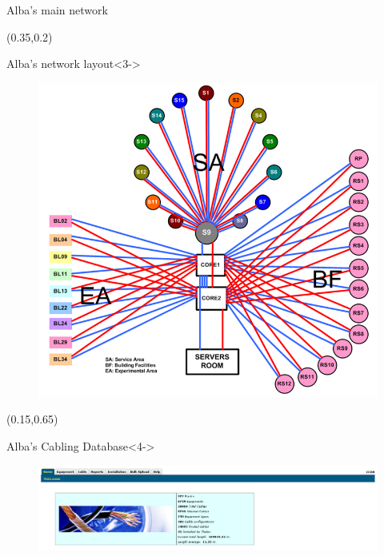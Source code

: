 \documentclass{beamer}
\begin{document}
\begin{frame}
\begin{textblock*}{50mm}
\begin{block}{Alba's main network}
\begin{figure}
            \end{figure}
        \end{block}
    \end{textblock*}
    \begin{textblock*}{50mm}(0.35\textwidth,0.2\textheight)
        \begin{block}{Alba's network layout}<3->
            \begin{figure}
                \includegraphics[width=\textwidth]{imgs/alba/Alba_NetworkLayout.png}
            \end{figure}
        \end{block}
    \end{textblock*}
    \begin{textblock*}{100mm}(0.15\textwidth,0.65\textheight)
        \begin{block}{Alba's Cabling Database}<4->
            \begin{figure}
                \includegraphics[width=\textwidth]{imgs/alba/20130916_ccdb.png}
            \end{figure}

\end{block}
\end{textblock*}
\end{frame}
\end{document}
